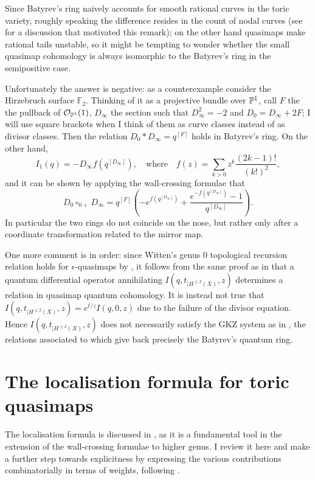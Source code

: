 Since Batyrev's ring naively accounts for smooth rational curves in the toric variety, roughly speaking the difference resides in the count of nodal curves (see \cite{HScounting} for a discussion that motivated this remark); on the other hand quasimaps make rational tails unstable, so it might be tempting to wonder whether the small quasimap cohomology is always isomorphic to the Batyrev's ring in the semipositive case.

Unfortunately the answer is negative: as a counterexample consider the Hirzebruch surface $\mathbb F_2$. Thinking of it as a projective bundle over $\mathbb P^1$, call $F$ the the pullback of $\mathcal{O}_{\mathbb P^1}(1)$, $D_\infty$ the section such that $D_\infty^2=-2$ and $D_0=D_\infty+2F$; I will use square brackets when I think of them as curve classes instead of as divisor classes. Then the relation $D_0*D_\infty=q^{[F]}$ holds in Batyrev's ring. On the other hand, \[I_1(q)=-D_\infty f(q^{[D_\infty]}), \quad \text{where}\quad f(z)=\sum_{k>0}z^k \frac{(2k-1)!}{(k!)^2},\] and it can be shown by applying the wall-crossing formulae that
\[ D_0\circ_{0+}D_\infty=q^{[F]}\left(-e^{f(q^{[D_\infty]})}+\frac{e^{-f(q^{[D_\infty]})}-1}{q^{[D_\infty]}}\right).\]
In particular the two rings do not coincide on the nose, but rather only after a coordinate transformation related to the mirror map.

One more comment is in order: since Witten's genus $0$ topological recursion relation holds for $\epsilon$-quasimaps by \cite[Corollary 2.3.4]{CF-K-higher-genus}, it follows from the same proof as in \cite[Theorem 10.3.1]{MS} that a quantum differential operator annihilating $I(q,t_{|H^{\leq 2}(X)},z)$ determines a relation in quasimap quantum cohomology. It is instead not true that $I(q,t_{|H^{\leq 2}(X)},z)=e^{t/z}I(q,0,z)$ due to the failure of the divisor equation. Hence $I(q,t_{|H^{\leq 2}(X)},z)$ does not necessarily satisfy the GKZ system as in \cite[\S 5.5.3]{MS}, the relations associated to which give back precisely the Batyrev's quantum ring.

\section{The localisation formula for toric quasimaps}
The localisation formula is discussed in \cite[\S 5]{CF-K-higher-genus}, as it is a fundamental tool in the extension of the wall-crossing formulae to higher genus. I review it here and make a further step towards explicitness by expressing the various contributions combinatorially in terms of weights, following \cite{HolgerSpielberg}.

